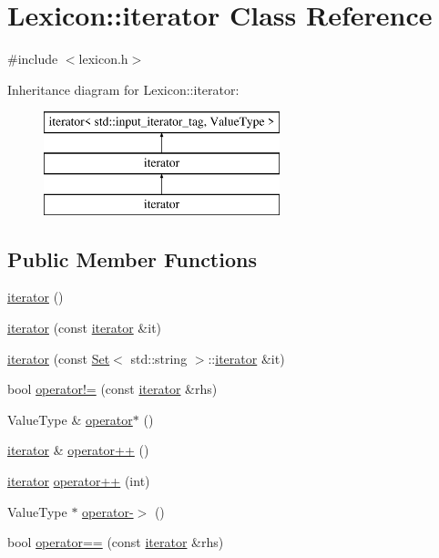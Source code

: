 \hypertarget{classLexicon_1_1iterator}{}\section{Lexicon\+:\+:iterator Class Reference}
\label{classLexicon_1_1iterator}


{\ttfamily \#include $<$lexicon.\+h$>$}

Inheritance diagram for Lexicon\+:\+:iterator\+:\begin{figure}[H]
\begin{center}
\leavevmode
\includegraphics[height=3.000000cm]{classLexicon_1_1iterator}
\end{center}
\end{figure}
\subsection*{Public Member Functions}
\begin{DoxyCompactItemize}
\item 
\mbox{\hyperlink{classLexicon_1_1iterator_a67d652c2433cf9217ed2a1485092fdd1}{iterator}} ()
\item 
\mbox{\hyperlink{classLexicon_1_1iterator_a698b7553261e7209d6c29fb55627dce4}{iterator}} (const \mbox{\hyperlink{classLexicon_1_1iterator}{iterator}} \&it)
\item 
\mbox{\hyperlink{classLexicon_1_1iterator_a6cb8fe4bd22d3efd7d0d01387a001009}{iterator}} (const \mbox{\hyperlink{classSet}{Set}}$<$ std\+::string $>$\+::\mbox{\hyperlink{classLexicon_1_1iterator}{iterator}} \&it)
\item 
bool \mbox{\hyperlink{classSet_1_1iterator_ae1983f2cb0df1f0cbe77ac29590e2e2b}{operator!=}} (const \mbox{\hyperlink{classLexicon_1_1iterator}{iterator}} \&rhs)
\item 
Value\+Type \& \mbox{\hyperlink{classSet_1_1iterator_ae7b3826e734ec2f7c79f5196fad83989}{operator$\ast$}} ()
\item 
\mbox{\hyperlink{classLexicon_1_1iterator}{iterator}} \& \mbox{\hyperlink{classSet_1_1iterator_af1b1c7856a59f34c7d3570f946a2ff00}{operator++}} ()
\item 
\mbox{\hyperlink{classLexicon_1_1iterator}{iterator}} \mbox{\hyperlink{classSet_1_1iterator_a538d230f8b52d2bc0950e26ce74ec239}{operator++}} (int)
\item 
Value\+Type $\ast$ \mbox{\hyperlink{classSet_1_1iterator_a5ba42337ec7bae549bb135838933b0ea}{operator-\/$>$}} ()
\item 
bool \mbox{\hyperlink{classSet_1_1iterator_a798956e7a65ef16c891d129b3ced0f9e}{operator==}} (const \mbox{\hyperlink{classLexicon_1_1iterator}{iterator}} \&rhs)
\end{DoxyCompactItemize}


